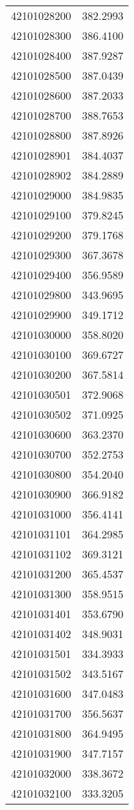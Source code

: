 \begin{longtable}[t]{lr}
42101028200 & 382.2993\\
42101028300 & 386.4100\\
42101028400 & 387.9287\\
42101028500 & 387.0439\\
42101028600 & 387.2033\\
42101028700 & 388.7653\\
42101028800 & 387.8926\\
42101028901 & 384.4037\\
42101028902 & 384.2889\\
42101029000 & 384.9835\\
42101029100 & 379.8245\\
42101029200 & 379.1768\\
42101029300 & 367.3678\\
42101029400 & 356.9589\\
42101029800 & 343.9695\\
42101029900 & 349.1712\\
42101030000 & 358.8020\\
42101030100 & 369.6727\\
42101030200 & 367.5814\\
42101030501 & 372.9068\\
42101030502 & 371.0925\\
42101030600 & 363.2370\\
42101030700 & 352.2753\\
42101030800 & 354.2040\\
42101030900 & 366.9182\\
42101031000 & 356.4141\\
42101031101 & 364.2985\\
42101031102 & 369.3121\\
42101031200 & 365.4537\\
42101031300 & 358.9515\\
42101031401 & 353.6790\\
42101031402 & 348.9031\\
42101031501 & 334.3933\\
42101031502 & 343.5167\\
42101031600 & 347.0483\\
42101031700 & 356.5637\\
42101031800 & 364.9495\\
42101031900 & 347.7157\\
42101032000 & 338.3672\\
42101032100 & 333.3205\\

\end{longtable}
